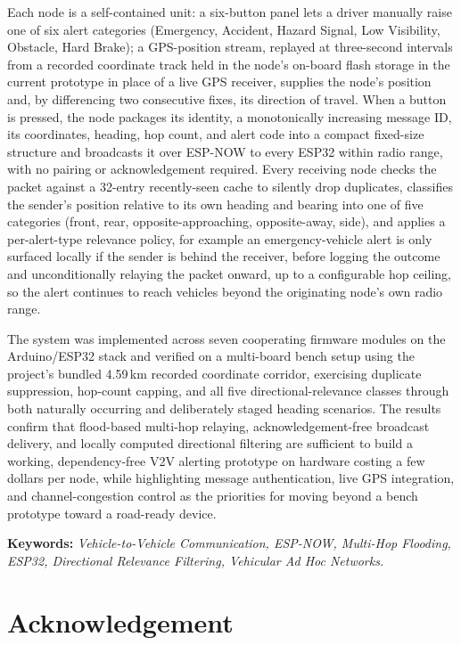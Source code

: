 \documentclass[12pt,a4paper]{report}
\newcommand{\frontchapter}[1]{%
  \chapter*{#1}
  \addcontentsline{toc}{chapter}{#1}
}
\begin{document}
Each node is a self-contained unit: a six-button panel lets a driver manually raise one of six alert categories (Emergency, Accident, Hazard Signal, Low Visibility, Obstacle, Hard Brake); a GPS-position stream, replayed at three-second intervals from a recorded coordinate track held in the node's on-board flash storage in the current prototype in place of a live GPS receiver, supplies the node's position and, by differencing two consecutive fixes, its direction of travel. When a button is pressed, the node packages its identity, a monotonically increasing message ID, its coordinates, heading, hop count, and alert code into a compact fixed-size structure and broadcasts it over ESP-NOW to every ESP32 within radio range, with no pairing or acknowledgement required. Every receiving node checks the packet against a 32-entry recently-seen cache to silently drop duplicates, classifies the sender's position relative to its own heading and bearing into one of five categories (front, rear, opposite-approaching, opposite-away, side), and applies a per-alert-type relevance policy, for example an emergency-vehicle alert is only surfaced locally if the sender is behind the receiver, before logging the outcome and unconditionally relaying the packet onward, up to a configurable hop ceiling, so the alert continues to reach vehicles beyond the originating node's own radio range.

The system was implemented across seven cooperating firmware modules on the Arduino/ESP32 stack and verified on a multi-board bench setup using the project's bundled 4.59\,km recorded coordinate corridor, exercising duplicate suppression, hop-count capping, and all five directional-relevance classes through both naturally occurring and deliberately staged heading scenarios. The results confirm that flood-based multi-hop relaying, acknowledgement-free broadcast delivery, and locally computed directional filtering are sufficient to build a working, dependency-free V2V alerting prototype on hardware costing a few dollars per node, while highlighting message authentication, live GPS integration, and channel-congestion control as the priorities for moving beyond a bench prototype toward a road-ready device.

\vspace{0.4cm}
\noindent\textbf{Keywords:} \textit{Vehicle-to-Vehicle Communication, ESP-NOW, Multi-Hop Flooding, ESP32, Directional Relevance Filtering, Vehicular Ad Hoc Networks.}

\frontchapter{Acknowledgement}
\end{document}

